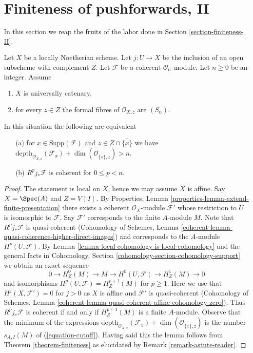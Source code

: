 \section{Finiteness of pushforwards, II}
\label{section-finiteness-pushforward-II}

\noindent
In this section we reap the fruits of the labor done in
Section \ref{section-finiteness-II}.

\begin{lemma}
\label{lemma-finiteness-Rjstar}
Let $X$ be a locally Noetherian scheme. Let $j : U \to X$ be the inclusion
of an open subscheme with complement $Z$. Let $\mathcal{F}$ be a coherent
$\mathcal{O}_U$-module. Let $n \geq 0$ be an integer. Assume
\begin{enumerate}
\item $X$ is universally catenary,
\item for every $z \in Z$ the formal fibres of
$\mathcal{O}_{X, z}$ are $(S_n)$.
\end{enumerate}
In this situation the following are equivalent
\begin{enumerate}
\item[(a)] for $x \in \text{Supp}(\mathcal{F})$ and
$z \in Z \cap \overline{\{x\}}$ we have
$\text{depth}_{\mathcal{O}_{X, x}}(\mathcal{F}_x) +
\dim(\mathcal{O}_{\overline{\{x\}}, z}) > n$,
\item[(b)] $R^pj_*\mathcal{F}$ is coherent for $0 \leq p < n$.
\end{enumerate}
\end{lemma}

\begin{proof}
The statement is local on $X$, hence we may assume $X$ is affine.
Say $X = \Spec(A)$ and $Z = V(I)$. By
Properties, Lemma \ref{properties-lemma-extend-finite-presentation}
there exists a coherent $\mathcal{O}_X$-module $\mathcal{F}'$
whose restriction to $U$ is isomorphic to $\mathcal{F}$.
Say $\mathcal{F}'$ corresponds to the finite $A$-module $M$.
Note that $R^pj_*\mathcal{F}$ is quasi-coherent
(Cohomology of Schemes, Lemma
\ref{coherent-lemma-quasi-coherence-higher-direct-images})
and corresponds to the $A$-module $H^p(U, \mathcal{F})$.
By Lemma \ref{lemma-local-cohomology-is-local-cohomology}
and the general facts in
Cohomology, Section \ref{cohomology-section-cohomology-support}
we obtain an exact sequence
$$
0 \to H^0_Z(M) \to M \to H^0(U, \mathcal{F}) \to H^1_Z(M) \to 0
$$
and isomorphisms $H^p(U, \mathcal{F}) = H^{p + 1}_Z(M)$ for
$p \geq 1$.
Here we use that $H^j(X, \mathcal{F}') = 0$ for $j > 0$ as $X$ is affine
and $\mathcal{F}'$ is quasi-coherent (Cohomology of Schemes,
Lemma \ref{coherent-lemma-quasi-coherent-affine-cohomology-zero}).
Thus $R^pj_*\mathcal{F}$ is coherent if and only if $H^{p + 1}_Z(M)$ is
a finite $A$-module. Observe that the minimum of the expressions
$\text{depth}_{\mathcal{O}_{X, x}}(\mathcal{F}_x) +
\dim(\mathcal{O}_{\overline{\{x\}}, z})$
is the number $s_{A, I}(M)$ of (\ref{equation-cutoff}).
Having said this the lemma follows from
Theorem \ref{theorem-finiteness}
as elucidated by Remark \ref{remark-astute-reader}.
\end{proof}

